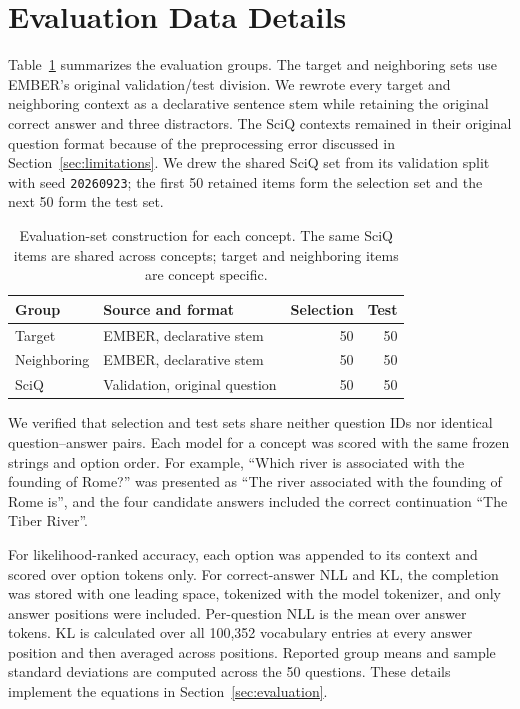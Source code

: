 \section{Evaluation Data Details}
\label{app:data}

Table~\ref{tab:evaluation-data} summarizes the evaluation groups. The
target and neighboring sets use EMBER's original validation/test division. We
rewrote every target and neighboring context as a declarative sentence stem
while retaining the original correct answer and three distractors. The SciQ
contexts remained in their original question format because of the
preprocessing error discussed in Section~\ref{sec:limitations}. We drew the
shared SciQ set from its validation split with seed
\texttt{20260923}; the first 50 retained items form the selection set and the
next 50 form the test set.

\begin{table}[t]
  \centering
  \scriptsize
  \begin{tabular}{llrr}
    \toprule
    Group & Source and format & Selection & Test \\
    \midrule
    Target & EMBER, declarative stem & 50 & 50 \\
    Neighboring & EMBER, declarative stem & 50 & 50 \\
    SciQ & Validation, original question & 50 & 50 \\
    \bottomrule
  \end{tabular}
  \caption{Evaluation-set construction for each concept. The same SciQ items
  are shared across concepts; target and neighboring items are concept
  specific.}
  \label{tab:evaluation-data}
\end{table}

We verified that selection and test sets share neither question IDs nor
identical question--answer pairs. Each model for a concept
was scored with the same frozen strings and option order. For example,
``Which river is associated with the founding of Rome?'' was presented as
``The river associated with the founding of Rome is'', and the four candidate
answers included the correct continuation ``The Tiber River''.

For likelihood-ranked accuracy, each option was appended to its context and
scored over option tokens only. For correct-answer NLL and KL, the completion
was stored with one leading space, tokenized with the model tokenizer, and
only answer positions were included. Per-question NLL is the mean over answer
tokens. KL is calculated over all 100,352 vocabulary entries at every answer
position and then averaged across positions. Reported group means and sample
standard deviations are computed across the 50 questions. These details
implement the equations in Section~\ref{sec:evaluation}.
